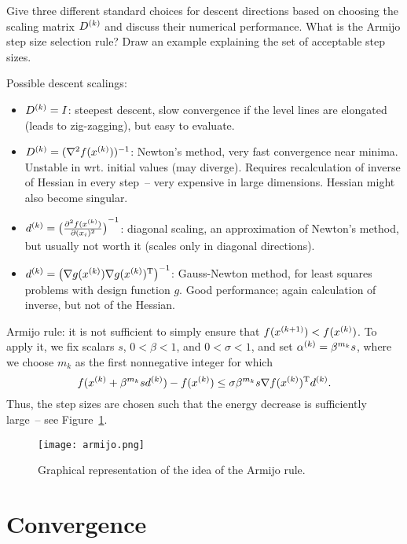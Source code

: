 \documentclass{article}
\begin{document}
\begin{question}
  Give three different standard choices for descent directions based on choosing the scaling matrix
  \(\kth{D}\) and discuss their numerical performance. What is the Armijo step size selection
  rule? Draw an example explaining the set of acceptable step sizes.
\end{question}
Possible descent scalings:
\begin{itemize}
\item \(\kth{D} = I\): steepest descent, slow convergence if the level lines are elongated (leads to
  zig-zagging), but easy to evaluate.
\item \(\kth{D} = (\nabla^2 f(\kth{x}))^{-1}\): Newton's method, very fast convergence near minima.
  Unstable in wrt. initial values (may diverge).  Requires recalculation of inverse of Hessian in
  every step~-- very expensive in large dimensions.  Hessian might also become singular.
\item \(\kth{d} = \del[1]{\pd[2]{f(\kth{x})}{(x_i)}}^{-1}\): diagonal scaling, an approximation of
  Newton's method, but usually not worth it (scales only in diagonal directions).
\item \(\kth{d} = \del[1]{\nabla g(\kth{x}) \T{\nabla g(\kth{x})}}^{-1}\): Gauss-Newton method, for
  least squares problems with design function \(g\). Good performance; again calculation of inverse,
  but not of the Hessian.
\end{itemize}

Armijo rule: it is not sufficient to simply ensure that \(f(\kth[k+1]{x}) < f(\kth{x})\). To apply
it, we fix scalars \(s\), \(0 < \beta < 1\), and \(0 < \sigma < 1\), and set
\(\kth{\alpha} = \beta^{m_k} s\), where we choose \(m_k\) as the first nonnegative integer for which
\begin{equation*}
  f(\kth{x} + \beta^{m_k} s \kth{d}) - f(\kth{x}) \leq \sigma \beta^{m_k} s \nabla \T{f(\kth{x})} \kth{d}.
\end{equation*}
Thus, the step sizes are chosen such that the energy decrease is sufficiently large~-- see
Figure~\ref{fig:armijo}.
\begin{figure}[H]
  \centering
  \texttt{[image: armijo.png]}
  \caption{Graphical representation of the idea of the Armijo rule.\label{fig:armijo}}
\end{figure}


\section{Convergence}
\end{document}
